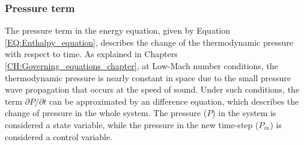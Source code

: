 \documentclass[../Article_Model_Parameters.tex]{subfiles}
\begin{document}

		
			\subsubsection{Pressure term} \label{CH: Pressure}
			
			The pressure term in the energy equation, given by Equation \ref{EQ:Enthalpy_equation}, describes the change of the thermodynamic pressure with respect to time. As explained in Chapters \ref{CH:Governing_equations_chapter}, at Low-Mach number conditions, the thermodynamic pressure is nearly constant in space due to the small pressure wave propagation that occurs at the speed of sound. Under such conditions, the term $\partial P/\partial t$ can be approximated by an difference equation, which describes the change of pressure in the whole system. The pressure ($P$) in the system is considered a state variable, while the pressure in the new time-step ($P_{in}$) is considered a control variable.
			
\end{document}
